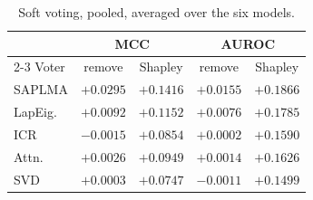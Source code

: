 \begin{table}[h]
  \centering
  \caption{Soft voting, pooled, averaged over the six models.}
  \footnotesize
  \begin{tabular}{l c c c c}
    \hline
    & \multicolumn{2}{c}{MCC} & \multicolumn{2}{c}{AUROC} \\
    \cline{2-3}\cline{4-5}
    Voter & remove & Shapley & remove & Shapley \\
    \hline
    SAPLMA & $+0.0295$ & $+0.1416$ & $+0.0155$ & $+0.1866$ \\
    LapEig. & $+0.0092$ & $+0.1152$ & $+0.0076$ & $+0.1785$ \\
    ICR & $-0.0015$ & $+0.0854$ & $+0.0002$ & $+0.1590$ \\
    Attn. & $+0.0026$ & $+0.0949$ & $+0.0014$ & $+0.1626$ \\
    SVD & $+0.0003$ & $+0.0747$ & $-0.0011$ & $+0.1499$ \\
    \hline
  \end{tabular}
\end{table}

